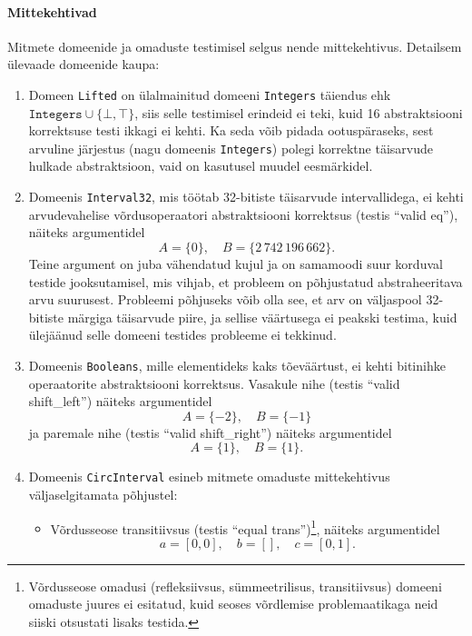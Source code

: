 \documentclass[../thesis.tex]{subfiles}
\begin{document}
\paragraph{Mittekehtivad}
Mitmete domeenide ja omaduste testimisel selgus nende mittekehtivus. Detailsem ülevaade domeenide kaupa:
\begin{enumerate}
	\item Domeen \texttt{Lifted} on ülalmainitud domeeni \texttt{Integers} täiendus ehk $\texttt{Integers} \cup \{\bot, \top\}$, siis selle testimisel erindeid ei teki, kuid 16 abstraktsiooni korrektsuse testi ikkagi ei kehti. Ka seda võib pidada ootuspäraseks, sest arvuline järjestus (nagu domeenis \texttt{Integers}) polegi korrektne täisarvude hulkade abstraktsioon, vaid on kasutusel muudel eesmärkidel.

	\item Domeenis \texttt{Interval32}, mis töötab 32-bitiste täisarvude intervallidega, ei kehti arvudevahelise võrdusoperaatori abstraktsiooni korrektsus (testis \enquote{valid eq}), näiteks argumentidel
	\[
		A = \{0\},\quad B = \{2\,742\,196\,662\}. %
	\]
	Teine argument on juba vähendatud kujul ja on samamoodi suur korduval testide jooksutamisel, mis vihjab, et probleem on põhjustatud abstraheeritava arvu suurusest. Probleemi põhjuseks võib olla see, et arv on väljaspool 32-bitiste märgiga täisarvude piire, ja sellise väärtusega ei peakski testima, kuid ülejäänud selle domeeni testides probleeme ei tekkinud.

	\item Domeenis \texttt{Booleans}, mille elementideks kaks tõeväärtust, ei kehti bitinihke operaatorite abstraktsiooni korrektsus. Vasakule nihe (testis \enquote{valid shift\_left}) näiteks argumentidel
	\[
		A = \{-2\},\quad B = \{-1\} %
	\]
	ja paremale nihe (testis \enquote{valid shift\_right}) näiteks argumentidel
	\[
		A = \{1\}, \quad B = \{1\}. %
	\]

	\item Domeenis \texttt{CircInterval} esineb mitmete omaduste mittekehtivus väljaselgitamata põhjustel:
	\begin{itemize}[nosep]
		\item Võrdusseose transitiivsus (testis \enquote{equal trans})\footnote{Võrdusseose omadusi (refleksiivsus, sümmeetrilisus, transitiivsus) domeeni omaduste juures ei esitatud, kuid seoses võrdlemise problemaatikaga neid siiski otsustati lisaks testida.}, näiteks argumentidel
		\[
			a = [0, 0],\quad b = [],\quad c = [0, 1]. %
		\]


\end{itemize}
\end{enumerate}
\end{document}
